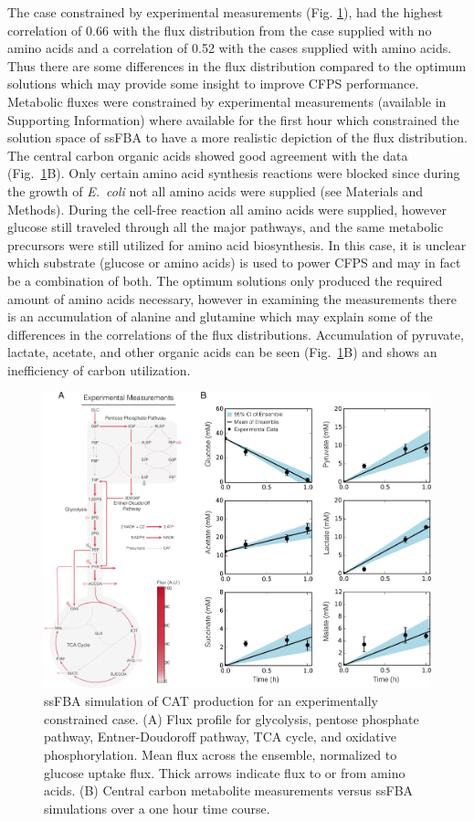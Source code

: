 \documentclass[journal=asbcd6,manuscript=article]{achemso}
\begin{document}
The case constrained by experimental measurements (Fig. \ref{fig:flux_exp}), had the highest correlation of 0.66 with the flux distribution from the case supplied with no amino acids and a correlation of 0.52 with the cases supplied with amino acids.
Thus there are some differences in the flux distribution compared to the optimum solutions which may provide some insight to improve CFPS performance. 
Metabolic fluxes were constrained by experimental measurements (available in Supporting Information) where available for the first hour which constrained the solution space of ssFBA to have a more realistic depiction of the flux distribution.
The central carbon organic acids showed good agreement with the data (Fig.~\ref{fig:flux_exp}B).
Only certain amino acid synthesis reactions were blocked since during the growth of \emph{E.~coli} not all amino acids were supplied (see Materials and Methods).
During the cell-free reaction all amino acids were supplied, however glucose still traveled through all the major pathways, and the same metabolic precursors were still utilized for amino acid biosynthesis.
In this case, it is unclear which substrate (glucose or amino acids) is used to power CFPS and may in fact be a combination of both.
The optimum solutions only produced the required amount of amino acids necessary, however in examining the measurements there is an accumulation of alanine and glutamine which may explain some of the differences in the correlations of the flux distributions.
Accumulation of pyruvate, lactate, acetate, and other organic acids can be seen (Fig.~\ref{fig:flux_exp}B) and shows an inefficiency of carbon utilization.
\begin{figure}[t!]
\includegraphics[width=1.00\textwidth]{./Figures/Exp_flux.pdf}
\caption{ssFBA simulation of CAT production for an experimentally constrained case. (A) Flux profile for glycolysis, pentose phosphate pathway, Entner-Doudoroff pathway, TCA cycle, and oxidative phosphorylation.  Mean flux across the ensemble, normalized to glucose uptake flux. Thick arrows indicate flux to or from amino acids. (B) Central carbon metabolite measurements versus ssFBA simulations over a one hour time course.}
\label{fig:flux_exp}
\end{figure}
\end{document}
